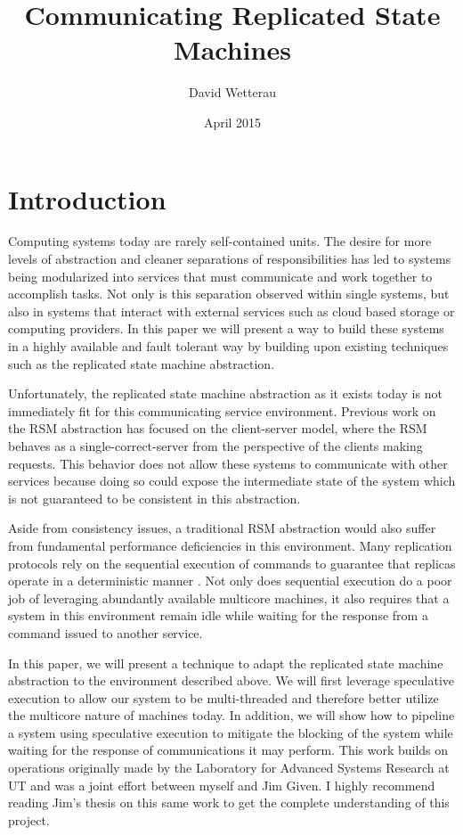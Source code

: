 \documentclass[11pt, oneside]{report}
\title{Communicating Replicated State Machines}
\author{David Wetterau}
\date{April 2015}
\begin{document}
\maketitle

\tableofcontents

\chapter{Introduction}\label{Introduction}
Computing systems today are rarely self-contained units. 
The desire for more levels of abstraction and cleaner separations of responsibilities has led to systems being modularized into services that must communicate and work together to accomplish tasks. 
Not only is this separation observed within single systems, but also in systems that interact with external services such as cloud based storage or computing providers. 
In this paper we will present a way to build these systems in a highly available and fault tolerant way by building upon existing techniques such as the replicated state machine abstraction.

Unfortunately, the replicated state machine abstraction as it exists today is not immediately fit for this communicating service environment. 
Previous work on the RSM abstraction has focused on the client-server model, where the RSM behaves as a single-correct-server from the perspective of the clients making requests. 
This behavior does not allow these systems to communicate with other services because doing so could expose the intermediate state of the system which is not guaranteed to be consistent in this abstraction.

Aside from consistency issues, a traditional RSM abstraction would also suffer from fundamental performance deficiencies in this environment. 
Many replication protocols rely on the sequential execution of commands to guarantee that replicas operate in a deterministic manner \cite{practicalBFT, upRight, hq, paxos}. 
Not only does sequential execution do a poor job of leveraging abundantly available multicore machines, it also requires that a system in this environment remain idle while waiting for the response from a command issued to another service.

In this paper, we will present a technique to adapt the replicated state machine abstraction to the environment described above. 
We will first leverage speculative execution \cite{eve, zyz} to allow our system to be multi-threaded and therefore better utilize the multicore nature of machines today. 
In addition, we will show how to pipeline a system using speculative execution to mitigate the blocking of the system while waiting for the response of communications it may perform. 
This work builds on operations originally made by the Laboratory for Advanced Systems Research at UT and was a joint effort between myself and Jim Given. 
I highly recommend reading Jim’s thesis on this same work to get the complete understanding of this project.
\end{document}
